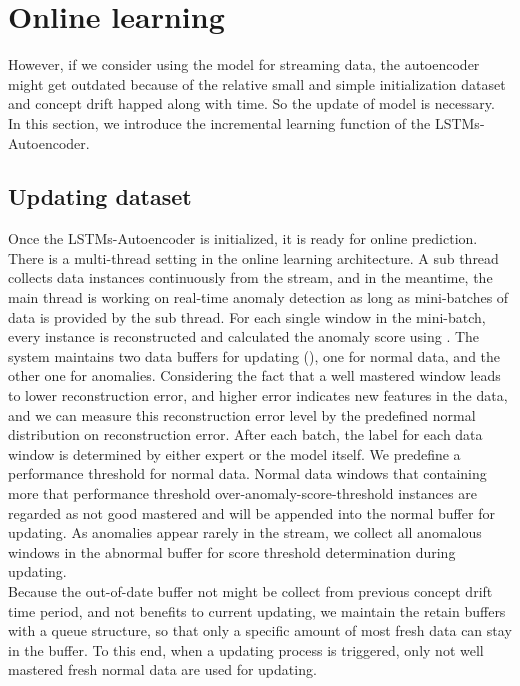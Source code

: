 \section{Online learning}
\label{sec:Onlinelearning}
However, if we consider using the model for streaming data, the autoencoder might get outdated because of the relative small and simple initialization dataset and concept drift happed along with time. So the update of model is necessary. In this section, we introduce the incremental learning function of the LSTMs-Autoencoder.

\subsection{Updating dataset}
\label{data}

Once the LSTMs-Autoencoder is initialized, it is ready for online prediction. There is a multi-thread setting in the online learning architecture. A sub thread collects data instances continuously from the stream, and in the meantime, the main thread is working on real-time anomaly detection as long as mini-batches of data is provided by the sub thread. For each single window in the mini-batch, every instance is reconstructed and calculated the anomaly score using . The system maintains two data buffers for updating (), one for normal data, and the other one for anomalies. Considering the fact that a well mastered window leads to lower reconstruction error, and higher error indicates new features in the data, and we can measure this reconstruction error level by the predefined normal distribution on reconstruction error. After each batch, the label for each data window is determined by either expert or the model itself. We predefine a performance threshold for normal data. Normal data windows that containing more that performance threshold over-anomaly-score-threshold instances are regarded as not good mastered and will be appended into the normal buffer for updating. As anomalies appear rarely in the stream, we collect all anomalous windows in the abnormal buffer for score threshold determination during updating. \\

Because the out-of-date buffer not might be collect from previous concept drift time period, and not benefits to current updating, we maintain the retain buffers with a queue structure, so that only a specific amount of most fresh data can stay in the buffer. To this end, when a updating process is triggered, only not well mastered fresh normal data are used for updating.


